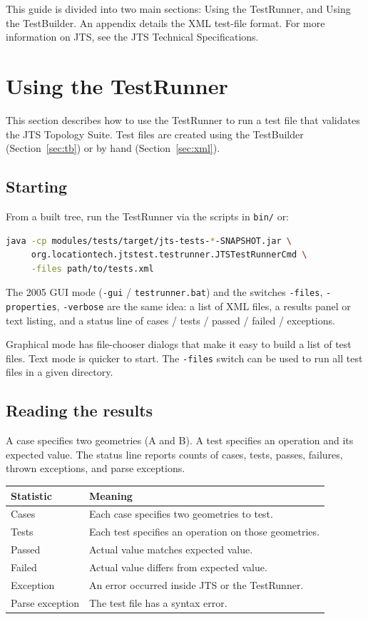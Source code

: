 \documentclass[11pt]{article}
\begin{document}
This guide is divided into two main sections: Using the TestRunner,
and Using the TestBuilder. An appendix details the XML test-file
format. For more information on JTS, see the JTS Technical
Specifications.

\section{Using the TestRunner}
This section describes how to use the TestRunner to run a test file
that validates the JTS Topology Suite. Test files are created using
the TestBuilder (Section~\ref{sec:tb}) or by hand
(Section~\ref{sec:xml}).

\subsection{Starting}
From a built tree, run the TestRunner via the scripts in
\texttt{bin/} or:

\begin{lstlisting}[language=bash]
java -cp modules/tests/target/jts-tests-*-SNAPSHOT.jar \
     org.locationtech.jtstest.testrunner.JTSTestRunnerCmd \
     -files path/to/tests.xml
\end{lstlisting}

The 2005 GUI mode (\texttt{-gui} / \texttt{testrunner.bat}) and the
switches \texttt{-files}, \texttt{-properties}, \texttt{-verbose} are
the same idea: a list of XML files, a results panel or text listing,
and a status line of cases / tests / passed / failed / exceptions.

Graphical mode has file-chooser dialogs that make it easy to build a
list of test files. Text mode is quicker to start. The
\texttt{-files} switch can be used to run all test files in a given
directory.

\subsection{Reading the results}
A case specifies two geometries (A and B). A test specifies an
operation and its expected value. The status line reports counts of
cases, tests, passes, failures, thrown exceptions, and parse
exceptions.

\begin{center}
\begin{tabular}{>{\raggedright\arraybackslash}p{3.4cm}p{9.8cm}}
  \toprule
  \textbf{Statistic} & \textbf{Meaning} \\
  \midrule
  Cases            & Each case specifies two geometries to test. \\
  Tests            & Each test specifies an operation on those
                     geometries. \\
  Passed           & Actual value matches expected value. \\
  Failed           & Actual value differs from expected value. \\
  Exception        & An error occurred inside JTS or the TestRunner. \\
  Parse exception  & The test file has a syntax error. \\
  \bottomrule
\end{tabular}
\end{center}
\end{document}
